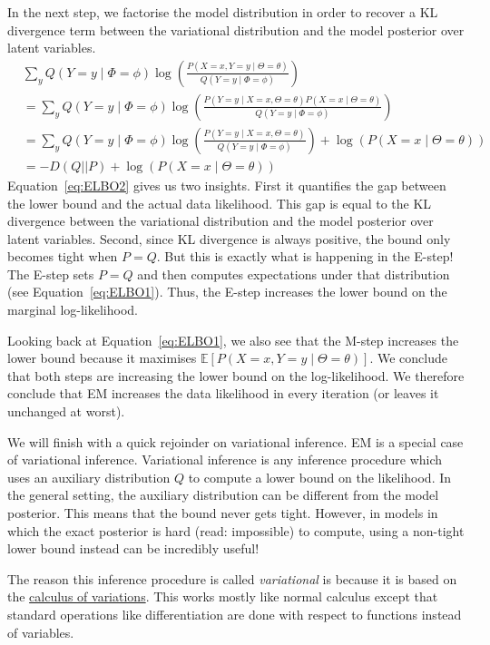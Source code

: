 \documentclass[11pt,leqno,a4paper]{report}\usepackage[]{graphicx}\usepackage[]{color}
\newcommand{\E}{\mathbb{E}}
\begin{document}
In the next step, we factorise the model distribution in order to recover a KL divergence term between
the variational distribution and the model posterior over latent variables.
\begin{align}
&\sum_{y} Q(Y=y \mid \Phi=\phi) \log\left(\frac{P(X=x, Y=y \mid  \Theta = \theta)}{Q(Y=y \mid \Phi=\phi)}\right) \\
&= \sum_{y} Q(Y=y \mid \Phi=\phi) \log\left(\frac{P(Y=y \mid X=x, \Theta = \theta)P(X=x \mid \Theta = \theta)}{Q(Y=y \mid \Phi=\phi)}\right) \\
&= \sum_{y} Q(Y=y \mid \Phi=\phi) \log\left(\frac{P(Y=y \mid X=x, \Theta = \theta)}{Q(Y=y \mid \Phi=\phi)}\right) + \log(P(X=x \mid \Theta=\theta)) \\
&= -D(Q||P) + \log(P(X=x \mid \Theta=\theta)) \label{eq:ELBO2}
\end{align}
Equation~\eqref{eq:ELBO2} gives us two insights. First it quantifies the gap between the lower bound
and the actual data likelihood. This gap is equal to the KL divergence between the variational distribution
and the model posterior over latent variables. Second, since KL divergence is always positive, the bound only becomes
tight when $ P=Q $. But this is exactly what is happening in the E-step! The E-step sets $ P=Q $ and
then computes expectations under that distribution (see Equation~\eqref{eq:ELBO1}). Thus, the E-step increases
the lower bound on the marginal log-likelihood.

Looking back at Equation~\eqref{eq:ELBO1}, we also see that the M-step increases the lower bound because 
it maximises $ \E\left[P(X=x, Y=y\mid \Theta = \theta)\right] $. We conclude that both steps
are increasing the lower bound on the log-likelihood. We therefore conclude that EM increases the data likelihood
in every iteration (or leaves it unchanged at worst).

We will finish with a quick rejoinder on variational inference. EM is a special case of variational inference.
Variational inference is any inference procedure which uses an auxiliary distribution $ Q $ to compute
a lower bound on the likelihood. In the general setting, the auxiliary distribution can be different from the 
model posterior. This means that the bound never gets tight. However, in models in which the exact posterior 
is hard (read: impossible) to compute, using a non-tight lower bound instead can be incredibly useful!

The reason this inference procedure is called \textit{variational} is because it is based on the 
\href{https://en.wikipedia.org/wiki/Calculus_of_variations}{calculus of variations}. This works mostly
like normal calculus except that standard operations like differentiation are done with respect to functions
instead of variables.
\end{document}
